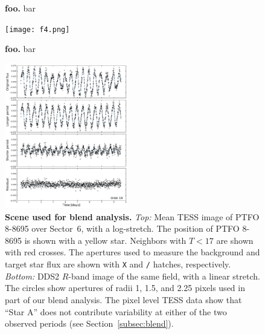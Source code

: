 \documentclass[12pt,twocolumn,tighten]{aastex62}
\begin{document}
\begin{figure}[t]
	\vspace{-0.7cm}
	\caption{ {\bf foo.}
    bar
		\label{fig:splitsignal}
	}
\end{figure}

\begin{figure}[t]
	\begin{center}
		\leavevmode
		\texttt{[image: f4.png]}
	\end{center}
	\vspace{-0.7cm}
	\caption{ {\bf foo.}
    bar
		\label{fig:phasefold}
	}
\end{figure}


\begin{figure}[t]
	\begin{center}
		\leavevmode
		\includegraphics[width=0.48\textwidth]{f1.pdf}
	\end{center}
	\vspace{-0.7cm}
	\caption{ {\bf Scene used for blend analysis.}
		{\it Top:} Mean TESS image of PTFO 8-8695 over Sector~6, with a log-stretch.
		The position of PTFO 8-8695 is shown with a yellow star.
		Neighbors with $T<17$ are shown with red crosses.
		The apertures used to measure the background and target star flux
		are shown with \texttt{X} and \texttt{/} hatches, respectively.
		{\it Bottom:} DDS2 $R$-band image of the same field, with a linear stretch. The circles show
		apertures of radii 1, 1.5, and 2.25 pixels used in part of our blend
		analysis.
		The pixel level TESS data show that ``Star A''  does not contribute variability at either of the two observed periods (see Section~\ref{subsec:blend}).
		\label{fig:scene}
	}
\end{figure}
\end{document}
